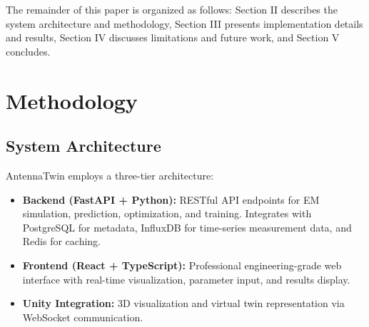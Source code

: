 \documentclass[conference]{IEEEtran}
\begin{document}
The remainder of this paper is organized as follows: Section II describes the system architecture and methodology, Section III presents implementation details and results, Section IV discusses limitations and future work, and Section V concludes.

\section{Methodology}

\subsection{System Architecture}
AntennaTwin employs a three-tier architecture:
\begin{itemize}
    \item \textbf{Backend (FastAPI + Python):} RESTful API endpoints for EM simulation, prediction, optimization, and training. Integrates with PostgreSQL for metadata, InfluxDB for time-series measurement data, and Redis for caching.
    \item \textbf{Frontend (React + TypeScript):} Professional engineering-grade web interface with real-time visualization, parameter input, and results display.
    \item \textbf{Unity Integration:} 3D visualization and virtual twin representation via WebSocket communication.
\end{itemize}
\end{document}
